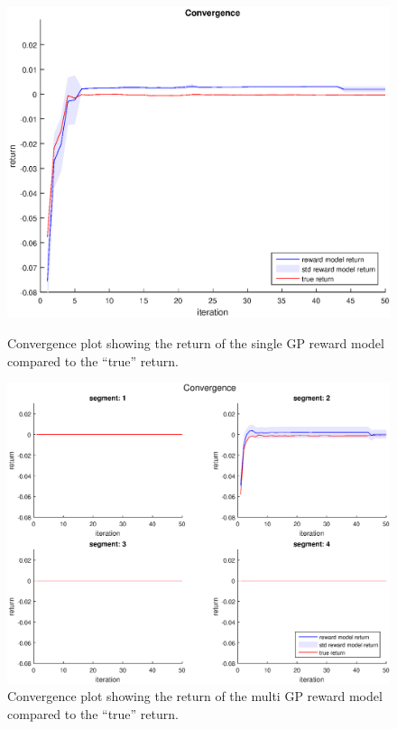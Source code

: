 \documentclass[mscThesis.tex]{subfiles}
\begin{document}
\begin{figure}[!htb]
    \centering
    \begin{minipage}{.5\textwidth}
        \centering
        \includegraphics[width=\textwidth, keepaspectratio=1]{figures/results/viapoint/convergence_single_noise.eps}
        \caption{Convergence plot showing the return of the single GP reward model compared to the ``true'' return.}
        \label{fig:vp-single-noise-con}
    \end{minipage}%
    \begin{minipage}{0.5\textwidth}
        \centering
        \includegraphics[width=\textwidth, keepaspectratio=1]{figures/results/viapoint/convergence_multi_noise.eps}
        \caption{Convergence plot showing the return of the multi GP reward model compared to the ``true'' return.}
        \label{fig:vp-multi-noise-con}
    \end{minipage}
\end{figure}
\end{document}
